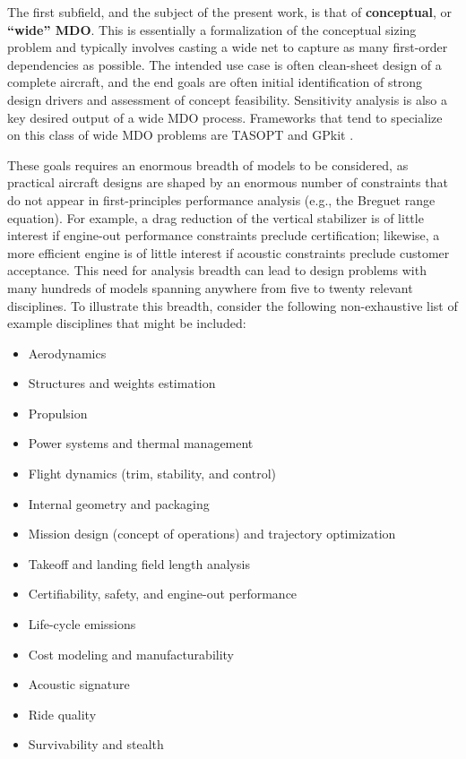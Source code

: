 The first subfield, and the subject of the present work, is that of \textbf{conceptual}, or \textbf{``wide'' MDO}. This is essentially a formalization of the conceptual sizing problem and typically involves casting a wide net to capture as many first-order dependencies as possible. The intended use case is often clean-sheet design of a complete aircraft, and the end goals are often initial identification of strong design drivers and assessment of concept feasibility. Sensitivity analysis is also a key desired output of a wide MDO process. Frameworks that tend to specialize on this class of wide MDO problems are TASOPT \cite{drela_tasopt_2010} and GPkit \cite{gpkit}.

These goals requires an enormous breadth of models to be considered, as practical aircraft designs are shaped by an enormous number of constraints that do not appear in first-principles performance analysis (e.g., the Breguet range equation). For example, a drag reduction of the vertical stabilizer is of little interest if engine-out performance constraints preclude certification; likewise, a more efficient engine is of little interest if acoustic constraints preclude customer acceptance. This need for analysis breadth can lead to design problems with many hundreds of models spanning anywhere from five to twenty relevant disciplines. To illustrate this breadth, consider the following non-exhaustive list of example disciplines that might be included:

\begin{multicols}{2}
    \begin{itemize}[noitemsep]
        \item Aerodynamics
        \item Structures and weights estimation
        \item Propulsion
        \item Power systems and thermal management
        \item Flight dynamics (trim, stability, and control)
        \item Internal geometry and packaging
        \item Mission design (concept of operations) and trajectory optimization
        \item Takeoff and landing field length analysis
        \item Certifiability, safety, and engine-out performance
        \item Life-cycle emissions
        \item Cost modeling and manufacturability
        \item Acoustic signature
        \item Ride quality
        \item Survivability and stealth
    \end{itemize}
\end{multicols}

